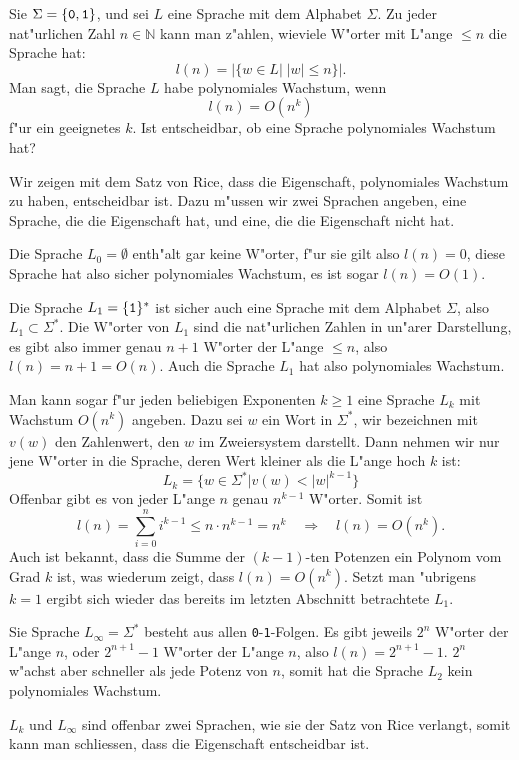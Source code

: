 Sie $\Sigma=\{\text{\tt 0},\text{\tt 1}\}$, und sei $L$ eine Sprache
mit dem Alphabet $\Sigma$. Zu jeder nat"urlichen Zahl $n\in\mathbb N$
kann man z"ahlen, wieviele W"orter mit L"ange $\le n$ die Sprache
hat:
\[
l(n)=|\{w\in L|\;|w|\le n\}|.
\]
Man sagt, die Sprache $L$ habe polynomiales Wachstum, wenn
\[
l(n)=O(n^k)
\]
f"ur ein geeignetes $k$. Ist entscheidbar, ob eine Sprache polynomiales
Wachstum hat?

\begin{loesung}
Wir zeigen mit dem Satz von Rice, dass die Eigenschaft, polynomiales
Wachstum zu haben, entscheidbar ist. Dazu m"ussen wir zwei Sprachen
angeben, eine Sprache, die die Eigenschaft hat, und eine, die die
Eigenschaft nicht hat.

Die Sprache $L_0=\emptyset$ enth"alt gar keine W"orter, f"ur sie
gilt also $l(n)=0$, diese Sprache hat also sicher polynomiales
Wachstum, es ist sogar $l(n)=O(1)$.

Die Sprache $L_1=\{\text{\tt 1}\}^*$ ist sicher auch eine Sprache mit
dem Alphabet $\Sigma$, also $L_1\subset \Sigma^*$. Die W"orter
von $L_1$ sind die nat"urlichen Zahlen in un"arer Darstellung,
es gibt also immer genau $n+1$ W"orter der L"ange $\le n$, also
$l(n)=n+1=O(n)$. Auch die Sprache $L_1$ hat also polynomiales Wachstum.

Man kann sogar f"ur jeden beliebigen Exponenten $k\ge 1$ eine Sprache $L_k$
mit Wachstum $O(n^k)$ angeben. Dazu sei $w$ ein Wort in $\Sigma^*$,
wir bezeichnen mit $v(w)$ den Zahlenwert, den $w$ im Zweiersystem
darstellt. Dann nehmen wir nur jene W"orter in die Sprache,
deren Wert kleiner als die L"ange hoch $k$ ist:
\[
L_k=\{ w\in\Sigma^*| v(w) < |w|^{k-1}\}
\]
Offenbar gibt es von jeder L"ange $n$ genau $n^{k-1}$ W"orter.
Somit ist
\[
l(n)=\sum_{i=0}^ni^{k-1}\le n\cdot n^{k-1}=n^k\quad\Rightarrow\quad l(n)=O(n^k).
\]
Auch ist bekannt, dass die Summe der $(k-1)$-ten Potenzen ein
Polynom vom Grad $k$ ist, was wiederum zeigt, dass $l(n)=O(n^k)$.
Setzt man "ubrigens $k=1$ ergibt
sich wieder das bereits im letzten Abschnitt betrachtete
$L_1$.

Sie Sprache $L_\infty=\Sigma^*$ besteht aus allen {\tt 0}-{\tt 1}-Folgen.
Es gibt jeweils $2^n$ W"orter der L"ange $n$, oder $2^{n+1}-1$ W"orter
der L"ange $n$, also $l(n)=2^{n+1}-1$. $2^n$ w"achst aber schneller
als jede Potenz von $n$, somit hat die Sprache $L_2$ kein polynomiales
Wachstum.

$L_k$ und $L_\infty$ sind offenbar zwei Sprachen, wie sie der Satz von
Rice verlangt, somit kann man schliessen, dass die Eigenschaft
entscheidbar ist.
\end{loesung}
